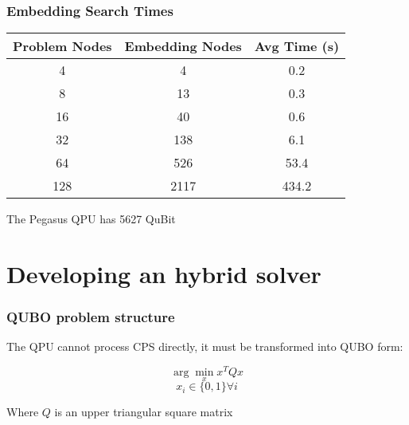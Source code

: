 \documentclass[aspectratio=169]{beamer}
\begin{document}
\begin{frame}\frametitle{Embedding Search Times}

    \begin{table}
        \centering
        \begin{tabular}{c|c|c}
            Problem Nodes & Embedding Nodes & Avg Time (s) \\ \hline
            4 & 4 & 0.2 \\
            8 & 13 & 0.3 \\
            16 & 40 & 0.6 \\
            32 & 138 & 6.1 \\
            64 & 526 & 53.4 \\
            128 & 2117 & 434.2 \\
        \end{tabular}
    \end{table}

    \begin{center}
        The Pegasus QPU has 5627 QuBit
    \end{center}

\end{frame}

\section{Developing an hybrid solver}

\begin{frame}\frametitle{QUBO problem structure}

    The QPU cannot process CPS directly, it must be transformed into QUBO form:

    $$\arg\min_x x^TQx$$
    $$x_i \in \{0, 1\} \forall i$$

    Where $Q$ is an upper triangular square matrix

\end{frame}
\end{document}

